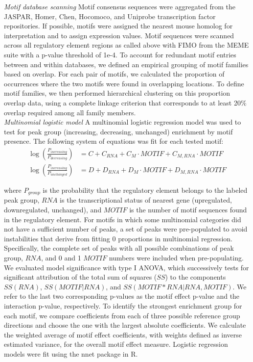 \textit{Motif database scanning} Motif consensus sequences were aggregated from the JASPAR, Homer, Chen, Hocomoco, and Uniprobe transcription factor repositories. If possible, motifs were assigned the nearest mouse homolog for interpretation and to assign expression values. Motif sequences were scanned across all regulatory element regions as called above with FIMO from the MEME suite \cite{grant2011} with a p-value threshold of 1e-4. To account for redundant motif entries between and within databases, we defined an empirical grouping of motif families based on overlap. For each pair of motifs, we calculated the proportion of occurrences where the two motifs were found in overlapping locations. To define motif families, we then performed hierarchical clustering on this proportion overlap data, using a complete linkage criterion that corresponds to at least 20\% overlap required among all family members. 
\\
\textit{Multinomial logistic model} A multinomial logistic regression model was used to test for peak group (increasing, decreasing, unchanged) enrichment by motif presence. The following system of equations was fit for each tested motif: 
\begin{align}
	\log{\left(\frac{P_{increasing}}{P_{decreasing}}\right)} &= C + C_{RNA} + C_M \cdot MOTIF + C_{M,RNA} \cdot MOTIF \\
	\log{\left(\frac{P_{increasing}}{P_{unchanged}}\right)} &= D + D_{RNA} + D_M \cdot MOTIF + D_{M,RNA} \cdot MOTIF
\end{align}

where $P_{group}$ is the probability that the regulatory element belongs to the labeled peak group, $RNA$ is the transcriptional status of nearest gene (upregulated, downregulated, unchanged), and $MOTIF$ is the number of motif sequences found in the regulatory element. For motifs in which some multinomial categories did not have a sufficient number of peaks, a set of peaks were pre-populated to avoid instabilities that derive from fitting 0 proportions in multinomial regression. Specifically, the complete set of peaks with all possible combinations of peak group, $RNA$, and 0 and 1 $MOTIF$ numbers were included when pre-populating. We evaluated model significance with type I ANOVA, which successively tests for significant attribution of the total sum of squares ($SS$) to the components $SS(RNA)$, $SS(MOTIF | RNA)$, and $SS(MOTIF*RNA | RNA, MOTIF)$. We refer to the last two corresponding p-values as the motif effect p-value and the interaction p-value, respectively. To identify the strongest enrichment group for each motif, we compare coefficients from each of three possible reference group directions and choose the one with the largest absolute coefficients. We calculate the weighted average of motif effect coefficients, with weights defined as inverse estimated variance, for the overall motif effect measure. Logistic regression models were fit using the nnet package in R. 




